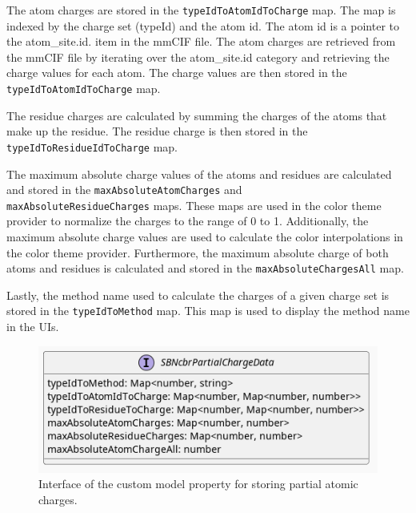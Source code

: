 \documentclass[
  digital,     %
  oneside,     %
  nosansbold,  %
  nocolorbold, %
  lof,         %
  lot,         %
]{fithesis4}
\begin{document}
The atom charges are stored in the \texttt{typeIdToAtomIdToCharge} map. The map is indexed by the charge set (typeId) and the atom id. The atom id is a pointer to the atom\_site.id. item in the mmCIF file. The atom charges are retrieved from the mmCIF file by iterating over the atom\_site.id category and retrieving the charge values for each atom. The charge values are then stored in the \texttt{typeIdToAtomIdToCharge} map.

The residue charges are calculated by summing the charges of the atoms that make up the residue. The residue charge is then stored in the \texttt{typeIdToResidueIdToCharge} map.

The maximum absolute charge values of the atoms and residues are calculated and stored in the \texttt{maxAbsoluteAtomCharges} and \\
\texttt{maxAbsoluteResidueCharges} maps. These maps are used in the color theme provider to normalize the charges to the range of 0 to 1. Additionally, the maximum absolute charge values are used to calculate the color interpolations in the color theme provider. Furthermore, the maximum absolute charge of both atoms and residues is calculated and stored in the \texttt{maxAbsoluteChargesAll} map.

Lastly, the method name used to calculate the charges of a given charge set is stored in the \texttt{typeIdToMethod} map. This map is used to display the method name in the UIs.

\begin{figure}[htbp]
  \begin{center}
    \includegraphics[width=\textwidth]{out/figures/uml/interface/custom model property interface.png}
  \end{center}
  \caption[Interface of custom model property.]{Interface of the custom model property for storing partial atomic charges.}
  \label{fig:property_provider_interface}
\end{figure}
\end{document}
